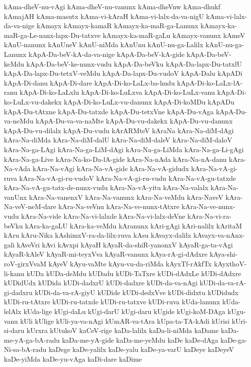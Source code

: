{kAma-dheV-nu-vAgi
kAma-dheV-nu-vanunx
kAma-dheVnw
kAma-dhukf
kAmajAH
kAma-masutx
kAma-vi-kAraH
kAma-vi-lalx-da-va-nigU
kAma-vi-lalx-da-va-nige
kAmayx
kAmayx-kamaR
kAmayx-ka-maR-ga-Lanunx
kAmayx-ka-maR-ga-Le-nanx-lapx-Du-tatxve
kAmayx-ka-maR-gaLu
kAmayx-vanunx
kAmeV
kAnU-nanunx
kAnUneV
kAnU-niMda
kAnUnu
kAnU-nu-ga-Lalilx
kAnU-nu-ga-Lanunx
kApA-Da-beV-kA-da-va-nige
kApA-Da-beV-kA-gide
kApA-Da-beV-keMdu
kApA-Da-beV-ke-nunx-vudu
kApA-Da-beVku
kApA-Da-lapx-Du-tatxlU
kApA-Da-lapx-Du-tetxV-veMdu
kApA-Da-lapx-Du-vudoV
kApA-Dalu
kApADi
kApA-Di-danu
kApA-Di-dare
kApA-Di-ko-LaLx-ba-hudu
kApA-Di-ko-LaLx-lA-ranu
kApA-Di-ko-LaLxlu
kApA-Di-ko-LuLxva
kApA-Di-ko-LuLx-vanu
kApA-Di-ko-LuLx-vu-dakekx
kApA-Di-ko-LuLx-vu-danunx
kApA-Di-koMDu
kApADu
kApA-Du-tAtxne
kApA-Du-tatxde
kApA-Du-tetxVne
kApA-Du-vAga
kApA-Du-va-neMdu
kApA-Du-va-va-naMte
kApA-Du-vu-dakekx
kApA-Du-vu-danunx
kApA-Du-vu-dilalx
kApA-Du-vudu
kArARMteV
kAraNa
kAra-Na-diM-dAgi
kAra-Na-diMda
kAra-Na-diM-dalU
kAra-Na-diM-daleV
kAra-Na-diM-daloV
kAra-Na-ga-LAgi
kAra-Na-ga-LiM-dAgi
kAra-Na-ga-LiMda
kAra-Na-ga-Li-gAgi
kAra-Na-ga-Live
kAra-Na-ko-Da-lA-gide
kAra-Na-nAda
kAra-Na-nA-danu
kAra-Na-vAda
kAra-Na-vAgi
kAra-Na-vA-gide
kAra-Na-vA-gidudx
kAra-Na-vA-gi-ruva
kAra-Na-vA-gi-ru-vudoV
kAra-Na-vA-gi-ru-vudu
kAra-Na-vA-gu-tatxde
kAra-Na-vA-gu-tatx-de-nunx-vudu
kAra-Na-vA-yitu
kAra-Na-valalx
kAra-Na-vanUnx
kAra-Na-vanenxV
kAra-Na-vanunx
kAra-Na-veMdu
kAra-NaveV
kAra-Na-veV-neM-dare
kAra-Na-veVnu
kAra-Na-ve-nunx-tAtxre
kAra-Na-ve-nunx-vudu
kAra-Na-vide
kAra-Na-vi-lalxde
kAra-Na-vi-lalx-deVne
kAra-Na-vi-ra-beVku
kAra-ka-gaLU
kAra-ka-veMdu
kAranunx
kAri-gAgi
kAri-nalilx
kAritaM
kAru
kAru-Nika
kAshimxV-ra-da-lilx-ruva
kAsu
kAvayx-dalilx
kAvayx-va-nAnx-gali
kAveVri
kAvi
kAvxpi
kAyaH
kAyaR-da-shiR-yanonxV
kAyaR-ga-ta-vAgi
kAyaR-kAleV
kAyaR-mi-teyxVva
kAyaR-vanunx
kAya-rA-gi-dAdxre
kAya-shi-roV-girxVvaM
kAyeV
kAyu-vaMte
kAyu-vu-da-riMda
kAyxTf-rAkfTx
kAyxthoV-li-kanu
kUDa
kUDa-deMdu
kUDadu
kUDi-TaTxre
kUDi-dAdxLe
kUDi-dAdxre
kUDidUdx
kUDida
kUDi-dadxrU
kUDi-dadxre
kUDi-da-va-nAgi
kUDi-da-va-rA-gi-dadxru
kUDi-da-va-rA-giyU
kUDide
kUDi-dedxVve
kUDi-didxtu
kUDidudx
kUDi-ru-tAtxre
kUDi-ru-tatxde
kUDi-ru-tatxve
kUDi-ruva
kUda-lanunx
kUda-lelAlx
kUda-lige
kUgi-daLu
kUgi-darU
kUgi-daru
kUgide
kUgi-koM-DAga
kUgu-vanu
kUli
kUlige
kUli-ya-va-nAgi
kUmAR-va-tAra
kUpa-ta-TA-kAdi
kUrisi
kUri-si-daru
kUrxra
kUtukoV
kaCeV-rige
kaDa-lalilx
kaDa-li-niMda
kaDame
kaDa-me-yA-ga-bA-radu
kaDa-me-yA-gide
kaDa-me-yeMdu
kaDe
kaDe-dAga
kaDe-ga-Ni-sa-bA-radu
kaDege
kaDe-yalilx
kaDe-yalu
kaDe-ya-varU
kaDeye
kaDeyeV
kaDe-yiMda
kaDe-yu-vAga
kaDi-dare
kaDime
}
